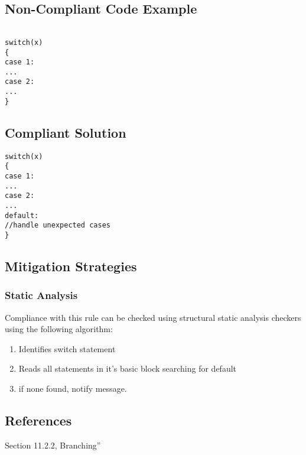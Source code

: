 \subsection{Non-Compliant Code Example}


\begin{verbatim}

switch(x)
{
case 1:
...
case 2:
...
}

\end{verbatim}

\subsection{Compliant Solution}


\begin{verbatim}
switch(x)
{
case 1:
...
case 2:
...
default:
//handle unexpected cases
}

\end{verbatim}

\subsection{Mitigation Strategies}
\subsubsection{Static Analysis} 

Compliance with this rule can be checked using structural static analysis checkers using the following algorithm:

\begin{enumerate}
\item Identifies switch statement
\item Reads all statements in it's basic block searching for default
\item if none found, notify message.
\end{enumerate}

\subsection{References}

 Section 11.2.2, Branching''